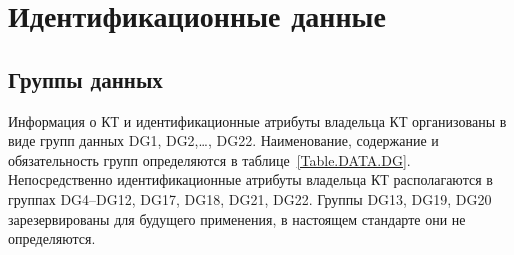 \chapter{Идентификационные данные}\label{DATA}

\section{Группы данных}\label{DATA.DG}

Информация о КТ и идентификационные атрибуты владельца КТ организованы в 
виде групп данных DG1, DG2,\ldots, DG22. Наименование, содержание и 
обязательность групп определяются в таблице~\ref{Table.DATA.DG}. 
%
Непосредственно идентификационные атрибуты владельца КТ располагаются 
в группах DG4--DG12, DG17, DG18, DG21, DG22. 
Группы DG13, DG19, DG20 зарезервированы для будущего 
применения, в настоящем стандарте они не определяются. 


